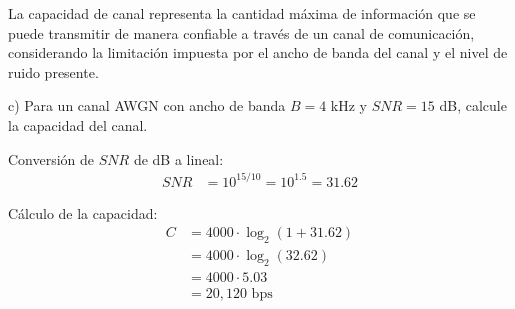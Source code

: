\bigskip
La capacidad de canal representa la cantidad máxima de información que se puede transmitir de manera confiable a través de un canal de comunicación, considerando la limitación impuesta por el ancho de banda del canal y el nivel de ruido presente. 
\bigskip

\noindent c) Para un canal AWGN con ancho de banda \(B = 4\) kHz y \(SNR = 15\) dB, calcule la capacidad del canal. \par
\bigskip

Conversión de $SNR$ de dB a lineal:
\begin{align*}
SNR &= 10^{15/10} = 10^{1.5} = 31.62
\end{align*}

Cálculo de la capacidad:
\begin{align*}
C &= 4000 \cdot \log_2 (1 + 31.62) \\
  &= 4000 \cdot \log_2 (32.62) \\
  &= 4000 \cdot 5.03 \\
  &= 20,120 \text{ bps}
\end{align*}